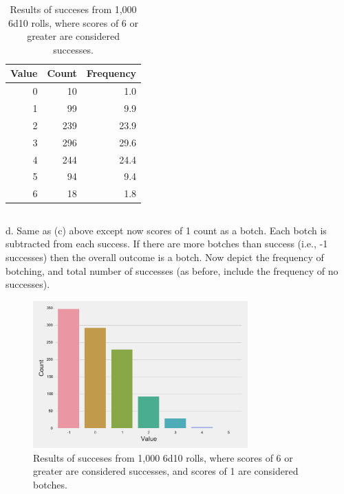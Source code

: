 \documentclass[twocolumn,letterpaper]{article}  %
\begin{document}
\begin{table}[h!]
\begin{center}
\begin{tabular}{*{3}{r}}
\toprule
Value & Count & Frequency \\
\midrule
0   &  10      &  1.0 \\
1   &  99      &  9.9 \\
2   & 239      & 23.9 \\
3   & 296      & 29.6 \\
4   & 244      & 24.4 \\
5   &  94      &  9.4 \\
6   &  18      &  1.8 \\
\bottomrule
\end{tabular}
\end{center}
\caption{Results of succeses from 1,000 6d10 rolls, where scores of 6 or greater are considered successes.}
\end{table}

\subsection{}
d. Same as (c) above except now scores of 1 count as a botch. Each botch is subtracted from each success. If there are more botches than success (i.e., -1 successes) then the overall outcome is a botch. Now depict the frequency of botching, and total number of successes (as before, include the frequency of no successes).
\begin{figure}[h!]
\centering
\includegraphics[width=3.25in]{6d10>6-botching.pdf}
\caption{Results of succeses from 1,000 6d10 rolls, where scores of 6 or greater are considered successes, and scores of 1 are considered botches.}
\end{figure}
\end{document}
